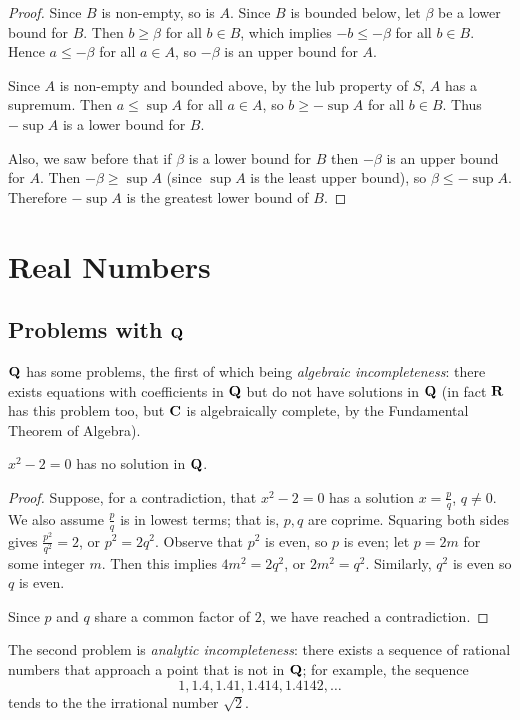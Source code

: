 \begin{proof}
Since $B$ is non-empty, so is $A$. Since $B$ is bounded below, let $\beta$ be a lower bound for $B$. Then $b\ge\beta$ for all $b\in B$, which implies $-b\le-\beta$ for all $b\in B$. Hence $a\le-\beta$ for all $a\in A$, so $-\beta$ is an upper bound for $A$.

Since $A$ is non-empty and bounded above, by the lub property of $S$, $A$ has a supremum. Then $a\le\sup A$ for all $a\in A$, so $b\ge-\sup A$ for all $b\in B$. Thus $-\sup A$ is a lower bound for $B$.

Also, we saw before that if $\beta$ is a lower bound for $B$ then $-\beta$ is an upper bound for $A$. Then $-\beta \ge \sup A$ (since $\sup A$ is the least upper bound), so $\beta \le -\sup A$. Therefore $-\sup A$ is the greatest lower bound of $B$.
\end{proof}
\pagebreak

\section{Real Numbers}
\subsection{Problems with $\mathbf Q$}
$\mathbf Q$ has some problems, the first of which being \emph{algebraic incompleteness}: there exists equations with coefficients in $\mathbf Q$ but do not have solutions in $\mathbf Q$ (in fact $\mathbf R$ has this problem too, but $\mathbf C$ is algebraically complete, by the Fundamental Theorem of Algebra).

\begin{lemma}
$x^2-2=0$ has no solution in $\mathbf Q$.
\end{lemma}

\begin{proof}
Suppose, for a contradiction, that $x^2-2=0$ has a solution $x=\frac{p}{q}$, $q\neq0$. We also assume $\frac{p}{q}$ is in lowest terms; that is, $p,q$ are coprime. Squaring both sides gives $\frac{p^2}{q^2}=2$, or $p^2=2q^2$. Observe that $p^2$ is even, so $p$ is even; let $p=2m$ for some integer $m$. Then this implies $4m^2=2q^2$, or $2m^2=q^2$. Similarly, $q^2$ is even so $q$ is even.

Since $p$ and $q$ share a common factor of $2$, we have reached a contradiction.
\end{proof}

The second problem is \emph{analytic incompleteness}: there exists a sequence of rational numbers that approach a point that is not in $\mathbf Q$; for example, the sequence
\[1,1.4,1.41,1.414,1.4142,\dots\]
tends to the the irrational number $\sqrt{2}$.

